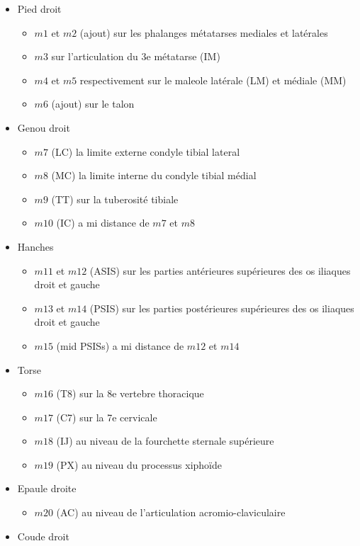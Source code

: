 \documentclass[a4paper, 10pt ]{article}
\begin{document}
\begin{itemize}
\item Pied droit
\begin{itemize}
\item $m1$ et $m2$ (ajout) sur les phalanges métatarses mediales et latérales
\item $m3$ sur l'articulation du 3e métatarse (IM)
\item $m4$ et $m5$ respectivement sur le maleole latérale (LM) et médiale (MM)
\item $m6$ (ajout) sur le talon
\end{itemize}
\item Genou droit
\begin{itemize}
\item $m7$ (LC) la limite externe condyle tibial lateral
\item $m8$ (MC) la limite interne du condyle tibial médial
\item $m9$ (TT) sur la tuberosité tibiale
\item $m10$ (IC) a mi distance de $m7$ et $m8$
\end{itemize}
\item Hanches
\begin{itemize}
\item$m11$ et $m12$  (ASIS)  sur les parties antérieures supérieures des os iliaques droit et gauche
\item $m13$ et $m14$ (PSIS)  sur les parties postérieures supérieures des os iliaques droit et gauche
\item  $m15$ (mid PSISs) a mi distance de $m12$ et $m14$
\end{itemize}
\item Torse
\begin{itemize}
\item $m16$ (T8) sur la 8e vertebre thoracique
\item $m17$ (C7) sur la 7e cervicale
\item $m18$ (IJ) au niveau de la fourchette sternale supérieure
\item $m19$ (PX) au niveau du processus xiphoïde
\end{itemize}
\item Epaule droite
\begin{itemize}
\item $m20$ (AC) au niveau de l'articulation acromio-claviculaire
\end{itemize}
\item{Coude droit}
\begin{itemize}

\end{itemize}
\end{itemize}
\end{document}
